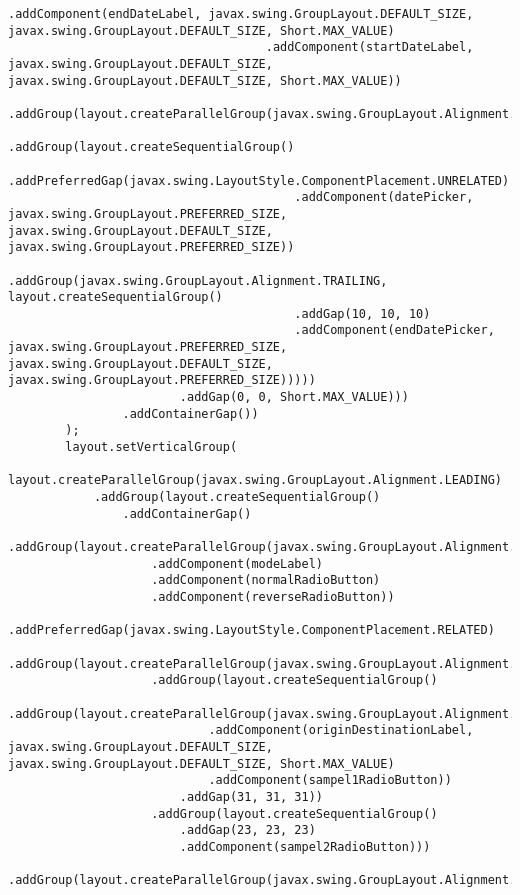 \begin{lstlisting}[caption= main.java]
                                    .addComponent(endDateLabel, javax.swing.GroupLayout.DEFAULT_SIZE, javax.swing.GroupLayout.DEFAULT_SIZE, Short.MAX_VALUE)
                                    .addComponent(startDateLabel, javax.swing.GroupLayout.DEFAULT_SIZE, javax.swing.GroupLayout.DEFAULT_SIZE, Short.MAX_VALUE))
                                .addGroup(layout.createParallelGroup(javax.swing.GroupLayout.Alignment.LEADING)
                                    .addGroup(layout.createSequentialGroup()
                                        .addPreferredGap(javax.swing.LayoutStyle.ComponentPlacement.UNRELATED)
                                        .addComponent(datePicker, javax.swing.GroupLayout.PREFERRED_SIZE, javax.swing.GroupLayout.DEFAULT_SIZE, javax.swing.GroupLayout.PREFERRED_SIZE))
                                    .addGroup(javax.swing.GroupLayout.Alignment.TRAILING, layout.createSequentialGroup()
                                        .addGap(10, 10, 10)
                                        .addComponent(endDatePicker, javax.swing.GroupLayout.PREFERRED_SIZE, javax.swing.GroupLayout.DEFAULT_SIZE, javax.swing.GroupLayout.PREFERRED_SIZE)))))
                        .addGap(0, 0, Short.MAX_VALUE)))
                .addContainerGap())
        );
        layout.setVerticalGroup(
            layout.createParallelGroup(javax.swing.GroupLayout.Alignment.LEADING)
            .addGroup(layout.createSequentialGroup()
                .addContainerGap()
                .addGroup(layout.createParallelGroup(javax.swing.GroupLayout.Alignment.BASELINE)
                    .addComponent(modeLabel)
                    .addComponent(normalRadioButton)
                    .addComponent(reverseRadioButton))
                .addPreferredGap(javax.swing.LayoutStyle.ComponentPlacement.RELATED)
                .addGroup(layout.createParallelGroup(javax.swing.GroupLayout.Alignment.LEADING)
                    .addGroup(layout.createSequentialGroup()
                        .addGroup(layout.createParallelGroup(javax.swing.GroupLayout.Alignment.BASELINE)
                            .addComponent(originDestinationLabel, javax.swing.GroupLayout.DEFAULT_SIZE, javax.swing.GroupLayout.DEFAULT_SIZE, Short.MAX_VALUE)
                            .addComponent(sampel1RadioButton))
                        .addGap(31, 31, 31))
                    .addGroup(layout.createSequentialGroup()
                        .addGap(23, 23, 23)
                        .addComponent(sampel2RadioButton)))
                .addGroup(layout.createParallelGroup(javax.swing.GroupLayout.Alignment.BASELINE)

\end{lstlisting}

